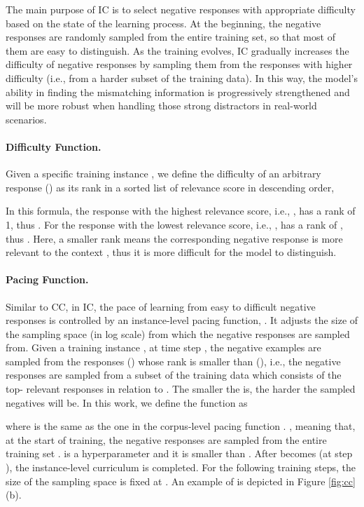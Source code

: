 \documentclass[11pt,a4paper]{article}
\begin{document}
 

The main purpose of IC is to select negative responses with appropriate difficulty based on the state of the learning process. At the beginning, the negative responses are randomly sampled from the entire training set, so that most of them are easy to distinguish. As the training evolves, IC gradually increases the difficulty of negative responses by sampling them from the responses with higher difficulty (i.e., from a harder subset of the training data). In this way, the model's ability in finding the mismatching information is progressively strengthened and will be more robust when handling those strong distractors in real-world scenarios. 
 

\paragraph{Difficulty Function.} Given a specific training instance , we define the difficulty of an arbitrary response  () as its rank in a sorted list of relevance score in descending order, 

In this formula, the response  with the highest relevance score, i.e., , has a rank of 1, thus . For the response  with the lowest relevance score, i.e., , has a rank of , thus . Here, a smaller rank means the corresponding negative response is more relevant to the context , thus it is more difficult for the model to distinguish.



\paragraph{Pacing Function.} 
Similar to CC, in IC, the pace of learning from easy to difficult negative responses is controlled by an instance-level pacing function, . It adjusts the size of the sampling space (in log scale) from which the negative responses are sampled from. Given a training instance , at time step , the negative examples are sampled from the responses  () whose rank is smaller than  (), i.e., the negative responses are sampled from a subset of the training data which consists of the top- relevant responses in relation to . The smaller the  is, the harder the sampled negatives will be. In this work, we define the function  as 

where  is the same as the one in the corpus-level pacing function . , meaning that, at the start of training, the negative responses are sampled from the entire training set .  is a hyperparameter and it is smaller than . After  becomes  (at step ), the instance-level curriculum is completed. For the following training steps, the size of the sampling space is fixed at . An example of  is depicted in Figure \ref{fig:cc}(b).
\end{document}
